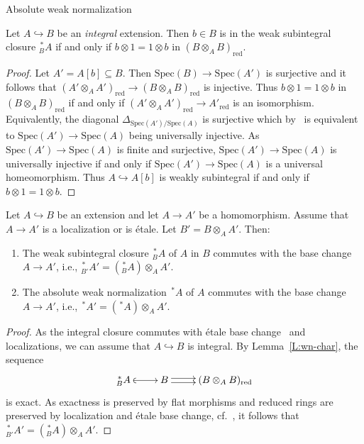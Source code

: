 \documentclass[a4paper,twoside,11pt]{amsart}[2009/07/02] %
\newcommand{\pref}[1]{\eqref{#1}}
\newcommand{\inj}{\hookrightarrow}
\newcommand{\etale}{\'{e}tale}
\newcommand{\Spec}{\mathrm{Spec}}
\newcommand{\red}{\mathrm{red}}
\newcommand{\rwn}[2]{{^{\,*}_{#1}#2}} %
\begin{document}
\begin{section}{Absolute weak normalization}
\begin{lemma}\label{L:wn-char}
Let $A\inj B$ be an \emph{integral} extension. Then $b\in B$ is in the weak
subintegral closure $\rwn{B}{A}$ if and only if $b\otimes 1 = 1\otimes b$ in
$(B\otimes_A B)_\red$.
\end{lemma}
\begin{proof}
Let $A'=A[b]\subseteq B$. Then $\Spec(B)\to \Spec(A')$ is surjective and it
follows that $(A'\otimes_A A')_\red\to (B\otimes_A B)_\red$ is injective.
Thus $b\otimes 1 = 1\otimes b$ in $(B\otimes_A B)_\red$ if and only if
$(A'\otimes_A A')_\red \to A'_\red$ is an isomorphism. Equivalently, the
diagonal $\Delta_{\Spec(A')/\Spec(A)}$ is surjective which
by~\cite[Prop.~3.7.1]{egaI_NE} is equivalent to $\Spec(A')\to\Spec(A)$ being
universally injective. As $\Spec(A')\to\Spec(A)$ is finite and surjective,
$\Spec(A')\to\Spec(A)$ is universally injective if and only if
$\Spec(A')\to\Spec(A)$ is a universal homeomorphism. Thus $A\inj A[b]$ is
weakly subintegral if and only if $b\otimes1 = 1\otimes b$.
\end{proof}

\begin{proposition}\label{P:wn-basechange}
Let $A\inj B$ be an extension and let $A\to A'$ be a homomorphism. Assume that
$A\to A'$ is a localization or is \etale{}. Let $B'=B\otimes_A A'$. Then:
\begin{enumerate}
\item The weak subintegral closure $\rwn{B}{A}$ of $A$ in $B$ commutes with the
base change $A\to A'$, i.e., $\rwn{B'}{A'}=(\rwn{B}{A})\otimes_A A'$.
\item The absolute weak normalization $\rwn{}{A}$ of $A$ commutes with the
base change $A\to A'$, i.e., $\rwn{}{A'}=(\rwn{}{A})\otimes_A A'$.
\end{enumerate}
\end{proposition}
\begin{proof}
As the integral closure commutes with \etale{} base
change~\cite[Prop.~18.12.15]{egaIV}
and localizations, we can assume that $A\inj B$ is integral. By
Lemma~\pref{L:wn-char}, the sequence
%
$$\xymatrix{
\rwn{B}{A}\ar@{(->}[r] & B\ar@<.5ex>[r] \ar@<-.5ex>[r] & (B\otimes_A B)_\red
}$$
%
is exact. As exactness is preserved by flat morphisms and reduced rings are
preserved by localization and \etale{} base change,
cf.~\cite[Prop.~17.5.7]{egaIV}, it follows that
$\rwn{B'}{A'}=(\rwn{B}{A})\otimes_A A'$.


\end{proof}
\end{section}
\end{document}
